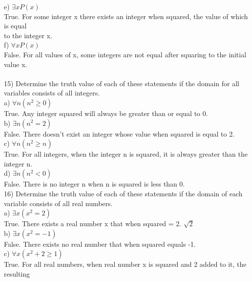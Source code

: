 \documentclass{article}
\begin{document}
\begin{flushleft}
\setlength\parindent{24pt}e) $\exists x P(x)$\\
\setlength\parindent{48pt} True.  For some integer x there exists an integer when squared, the value of which is equal\\
\setlength\parindent{48pt}to the integer x. \\
\setlength\parindent{24pt}f) $\forall x P(x)$ \\
\setlength\parindent{48pt} False.  For all values of x, some integers are not equal after squaring to the initial value x. \\
~\\\setlength\parindent{0pt}15) Determine the truth value of each of these statements if the domain for all variables consists of all integers. \\
\setlength\parindent{24pt}a) $\forall n(n^2 \geq 0)$\\
\setlength\parindent{48pt} True.  Any integer squared will always be greater than or equal to 0.\\
\setlength\parindent{24pt}b) $\exists n (n^2 = 2)$ \\
\setlength\parindent{48pt} False.  There doesn't exist an integer whose value when squared is equal to 2.\\
\setlength\parindent{24pt}c) $\forall n (n^2 \geq n)$ \\
\setlength\parindent{48pt}True.  For all integers, when the integer n is squared, it is always greater than the integer n.  \\
\setlength\parindent{24pt}d) $\exists n (n^2 < 0)$ \\
\setlength\parindent{48pt} False.  There is no integer n when n is squared is less than 0.\\
\setlength\parindent{0pt}16) Determine the truth value of each of these statements if the domain of each variable consists of all real numbers.\\
\setlength\parindent{24pt}a) $\exists x (x^2 = 2)$ \\
\setlength\parindent{48pt} True.  There exists a real number x that when squared = 2. $\sqrt{2}$ \\
\setlength\parindent{24pt}b) $\exists x (x^2 = -1)$\\
\setlength\parindent{48pt} False.  There exists no real number that when squared equals -1. \\
\setlength\parindent{24pt}c) $\forall x (x^2 +2 \geq 1)$\\
\setlength\parindent{48pt} True.  For all real numbers, when real number x is squared and 2 added to it, the resulting\\

\end{flushleft}
\end{document}
